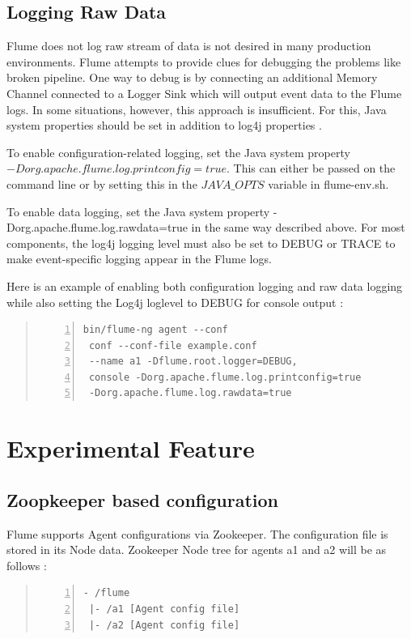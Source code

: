 \documentclass[9pt,twocolumn,twoside]{styles/osajnl}
\begin{document}
\subsection{Logging Raw Data}
Flume does not log raw stream of data is not desired in many production environments. Flume attempts to provide clues for debugging the problems like broken pipeline. One way to debug is by connecting an additional Memory Channel connected to a Logger Sink which will output event data to the Flume logs. In some situations, however, this approach is insufficient. For this, Java system properties should be set in addition to log4j properties \cite{user-manual}.

To enable configuration-related logging, set the Java system property $-Dorg.apache.flume.log.printconfig=true$. This can either be passed on the command line or by setting this in the $JAVA\_OPTS$ variable in flume-env.sh.

To enable data logging, set the Java system property -Dorg.apache.flume.log.rawdata=true in the same way described above. For most components, the log4j logging level must also be set to DEBUG or TRACE to make event-specific logging appear in the Flume logs.

Here is an example of enabling both configuration logging and raw data logging while also setting the Log4j loglevel to DEBUG for console output \cite{user-manual}:
\begin{quote}
\begin{Verbatim}[numbers=left]
 bin/flume-ng agent --conf 
 conf --conf-file example.conf 
 --name a1 -Dflume.root.logger=DEBUG,
 console -Dorg.apache.flume.log.printconfig=true 
 -Dorg.apache.flume.log.rawdata=true
\end{Verbatim}
\end{quote}
\section{Experimental Feature}
\subsection{Zoopkeeper based configuration}
Flume supports Agent configurations via Zookeeper. The configuration file is stored in its Node data.  Zookeeper Node tree for agents a1 and a2 will be as follows \cite{user-manual}:
\begin{quote}
\begin{Verbatim}[numbers=left]
- /flume
 |- /a1 [Agent config file]
 |- /a2 [Agent config file]
\end{Verbatim}
\end{quote}
\end{document}

